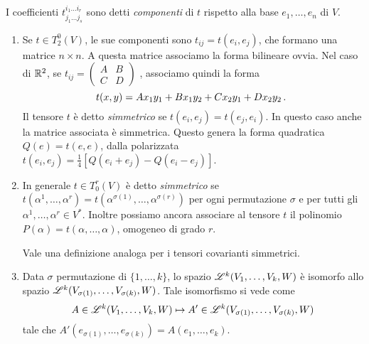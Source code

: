 \begin{definition} 
	I coefficienti $t_{j_1\ldots j_s}^{i_1\ldots i_r}$ sono detti \emph{componenti} di $t$ rispetto alla base $e_1,\ldots,e_n$ di $V$.
\end{definition}

\begin{example} 
\begin{enumerate}
	\item Se $t\in T_2^0(V)$, le sue componenti sono $t_{ij} = t(e_i,e_j)$, che formano una matrice $n\times n$. A questa matrice associamo la forma bilineare ovvia.
	Nel caso di $\mathbb R^2$, se $t_{ij} = \left(\begin{matrix}
	                                  A & B \\
	                                  C & D 
	                                 \end{matrix}\right)$
	, associamo quindi la forma 
	\begin{equation*}
		t(x,y) = Ax_1y_1+Bx_1y_2+Cx_2y_1+Dx_2y_2\, \text{. }
	\end{equation*}
	Il tensore $t$ è detto \emph{simmetrico} se $t(e_i,e_j) =t(e_j,e_i)$. In questo caso anche la matrice associata è simmetrica. Questo genera la forma quadratica $Q(e) = t(e,e)$, dalla polarizzata $t(e_i,e_j) = \frac 14 [Q(e_i+e_j)-Q(e_i-e_j)]$.
	
	\item In generale $t\in T_0^r(V)$ è detto \emph{simmetrico} se $t(\alpha^1,\ldots,\alpha^r) = t(\alpha^{\sigma(1)},\ldots,\alpha^{\sigma(r)})$ per ogni permutazione $\sigma$ e per tutti gli $\alpha^1,\ldots,\alpha^r \in V^*$.
	Inoltre possiamo ancora associare al tensore $t$ il polinomio $P(\alpha) = t(\alpha,\ldots,\alpha)$, omogeneo di grado $r$.
	
	Vale una definizione analoga per i tensori covarianti simmetrici.
	\item Data $\sigma$ permutazione di $\{1,\ldots,k\}$, lo spazio $\mathscr L^k(V_1,\ldots,V_k,W)$ è isomorfo allo spazio $\mathscr L^k(V_{\sigma(1)},\ldots,V_{\sigma(k)},W)$.
	Tale isomorfismo si vede come 
	\begin{equation*}
		A \in \mathscr L^k(V_1,\ldots,V_k,W) \mapsto A'\in \mathscr L^k(V_{\sigma(1)},\ldots,V_{\sigma(k)},W)
	\end{equation*}
	tale che $A'(e_{\sigma(1)},\ldots,e_{\sigma(k)}) = A(e_1,\ldots,e_k)$.
\end{enumerate}
\end{example}

